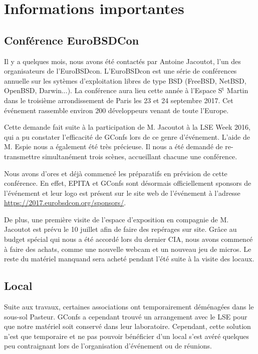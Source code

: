 \documentclass[12pt,a4paper]{article}
\begin{document}
\section{Informations importantes}

\subsection{Conférence EuroBSDCon}

Il y a quelques mois, nous avons été contactés par Antoine Jacoutot, l'un des organisateurs de l'EuroBSDcon. L'EuroBSDcon est une série de conférences annuelle sur les sytèmes d'exploitation libres de type BSD (FreeBSD, NetBSD, OpenBSD, Darwin...). La conférence aura lieu cette année à l'Espace S$^\text{t}$ Martin dans le troisième arrondissement de Paris les 23 et 24 septembre 2017. Cet événement rassemble environ 200 développeurs venant de toute l'Europe.

Cette demande fait suite à la participation de M. Jacoutot à la LSE Week 2016, qui a pu constater l'efficacité de GConfs lors de ce genre d'événement. L'aide de M. Espie nous a également été très précieuse.  Il nous a été demandé de re-transmettre simultanément trois scènes, accueillant chacune une conférence.

Nous avons d'ores et déjà commencé les préparatifs en prévision de cette conférence. En effet, EPITA et GConfs sont désormais officiellement sponsors de l'événement et leur logo est présent sur le site web de l'événement à l'adresse \url{https://2017.eurobsdcon.org/sponsors/}. 

De plus, une première visite de l'espace d'exposition en compagnie de M. Jacoutot est prévu le 10 juillet afin de faire des repérages sur site. Grâce au budget spécial qui nous a été accordé lors du dernier CIA, nous avons commencé à faire des achats, comme une nouvelle webcam et un nouveau jeu de micros. Le reste du matériel manquand sera acheté pendant l'été suite à la visite des locaux.

\subsection{Local}

Suite aux travaux, certaines associations ont temporairement déménagées dans le sous-sol Pasteur. GConfs a cependant trouvé un arrangement avec le LSE pour que notre matériel soit conservé dans leur laboratoire. Cependant, cette solution n'est que temporaire et ne pas pouvoir bénéficier d'un local s'est avéré quelques peu contraignant lors de l'organisation d'événement ou de réunions.
\end{document}
